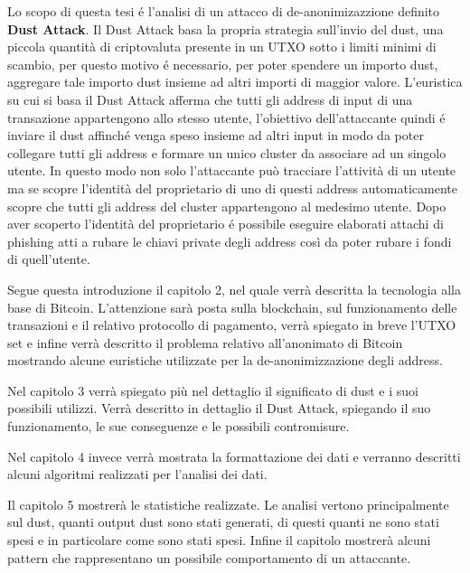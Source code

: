 Lo scopo di questa tesi é l'analisi di un attacco di de-anonimizazzione definito \textbf{Dust Attack}. Il Dust Attack basa la propria strategia sull'invio del dust, una piccola quantità di criptovaluta presente in un UTXO sotto i limiti minimi di scambio, per questo motivo é necessario, per poter spendere un importo dust, aggregare tale importo dust insieme ad altri importi di maggior valore. L'euristica su cui si basa il Dust Attack afferma che tutti gli address di input di una transazione appartengono allo stesso utente, l'obiettivo dell'attaccante quindi é inviare il dust affinché venga speso insieme ad altri input in modo da poter collegare tutti gli address e formare un unico cluster da associare ad un singolo utente. In questo modo non solo l'attaccante può tracciare l'attività di un utente ma se scopre l'identità del proprietario di uno di questi address automaticamente scopre che tutti gli address del cluster appartengono al medesimo utente. Dopo aver scoperto l'identità del proprietario é possibile eseguire elaborati attachi di phishing atti a rubare le chiavi private degli address così da poter rubare i fondi di quell'utente.



Segue questa introduzione il capitolo 2, nel quale verrà descritta la tecnologia alla base di Bitcoin. L'attenzione sarà posta sulla blockchain, sul funzionamento delle transazioni e il relativo protocollo di pagamento, verrà spiegato in breve l'UTXO set e infine verrà descritto il problema relativo all'anonimato di Bitcoin mostrando alcune euristiche utilizzate per la de-anonimizzazione degli address.

Nel capitolo 3 verrà spiegato più nel dettaglio il significato di dust e i suoi possibili utilizzi. Verrà descritto in dettaglio il Dust Attack, spiegando il suo funzionamento, le sue conseguenze e le possibili contromisure.

Nel capitolo 4 invece verrà mostrata la formattazione dei dati e verranno descritti alcuni algoritmi realizzati per l'analisi dei dati.

Il capitolo 5 mostrerà le statistiche realizzate. Le analisi vertono principalmente sul dust, quanti output dust sono stati generati, di questi quanti ne sono stati spesi e in particolare come sono stati spesi. Infine il capitolo mostrerà alcuni pattern che rappresentano un possibile comportamento di un attaccante.